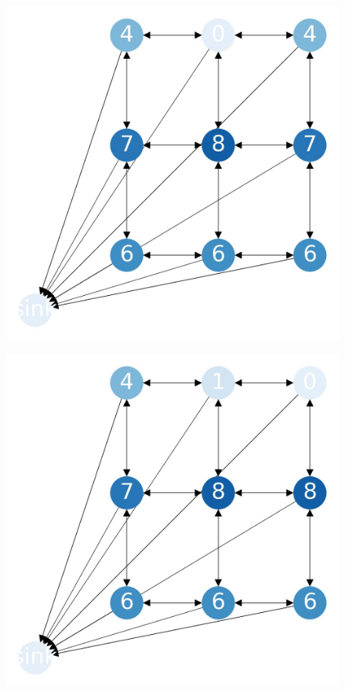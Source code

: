 \documentclass{beamer}
\begin{document}
    \begin{frame}
      \begin{figure}[h!]
        \centering
          \includegraphics[scale=0.25]{sandpile_-4}
      \end{figure}
    \end{frame}
    

    \begin{frame}
      \begin{figure}[h!]
        \centering
          \includegraphics[scale=0.25]{sandpile_-5}
      \end{figure}
    \end{frame}
    
\end{document}
